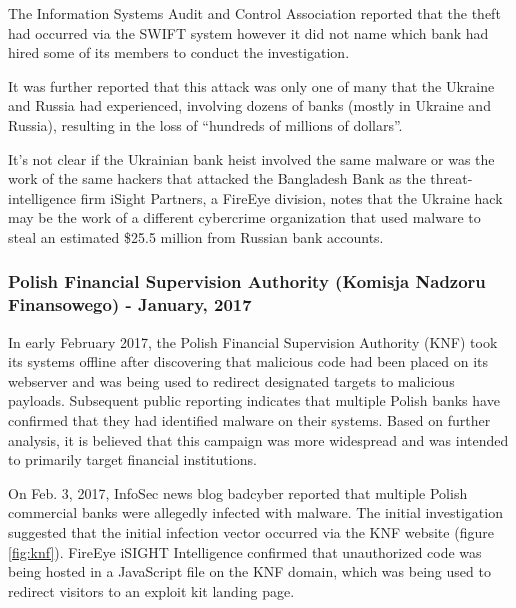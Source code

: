 \documentclass[12pt]{article}
\begin{document}
        The Information Systems Audit and Control Association reported that the theft had occurred via the SWIFT system however it did not name which bank had hired some of its members to conduct the investigation.\cite{BangladeshBankEnds}
        
        It was further reported that this attack was only one of many that the Ukraine and Russia had experienced, involving dozens of banks (mostly in Ukraine and Russia), resulting in the loss of “hundreds of millions of dollars”. 
        
        It's not clear if the Ukrainian bank heist involved the same malware or was the work of the same hackers that attacked the Bangladesh Bank as the threat-intelligence firm iSight Partners, a FireEye division, notes that the Ukraine hack may be the work of a different cybercrime organization that used malware to steal an estimated \$25.5 million from Russian bank accounts.\cite{HackersReportedlySteal2016}
   
    \subsubsection{Polish Financial Supervision Authority (Komisja Nadzoru Finansowego) - January, 2017}
        In early February 2017, the Polish Financial Supervision Authority (KNF) took its systems offline after discovering that malicious code had been placed on its webserver and was being used to redirect designated targets to malicious payloads. Subsequent public reporting indicates that multiple Polish banks have confirmed that they had identified malware on their systems. Based on further analysis, it is believed that this campaign was more widespread and was intended to primarily target financial institutions.
        
        On Feb. 3, 2017, InfoSec news blog badcyber reported that multiple Polish commercial banks were allegedly infected with malware. The initial investigation suggested that the initial infection vector occurred via the KNF website (figure \ref{fig:knf}). FireEye iSIGHT Intelligence confirmed that unauthorized code was being hosted in a JavaScript file on the KNF domain, which was being used to redirect visitors to an exploit kit landing page. 
        
\end{document}
